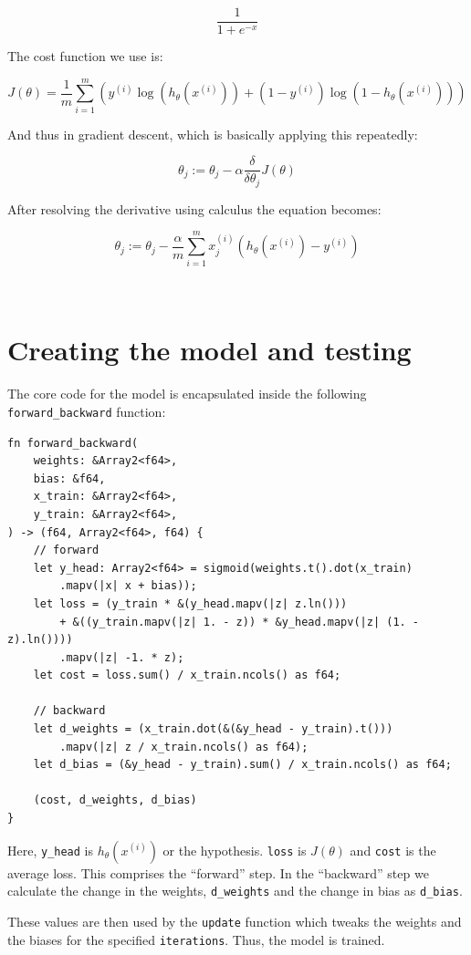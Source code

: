 \documentclass[12pt, a4]{article}
\begin{document}
\[ \frac{1}{1 + e^{-x}} \]

The cost function we use is:

\[ J(\theta) = \frac{1}{m} \sum_{i = 1}^{m}
  \left(
    y^{(i)}\log\left(h_{\theta}(x^{(i)})\right) +
    \left(1 - y^{(i)}\right)\log\left(1 - h_{\theta}(x^{(i)})\right)
  \right)
\]

And thus in gradient descent, which is basically applying this repeatedly:

\[
  \theta_{j} := \theta_{j} -
  \alpha \frac{\delta}{\delta\theta_{j}} J(\theta)
\]

After resolving the derivative using calculus the equation becomes:

\[
  \theta_{j} := \theta_{j} -
  \frac{\alpha}{m} \sum_{i = 1}^{m} x_{j}^{(i)}
  \left(h_{\theta}(x^{(i)}) - y^{(i)} \right)
\]

\

\section{Creating the model and testing}

The core code for the model is encapsulated inside the following
\texttt{forward\_backward} function:

\begin{verbatim}
fn forward_backward(
    weights: &Array2<f64>,
    bias: &f64,
    x_train: &Array2<f64>,
    y_train: &Array2<f64>,
) -> (f64, Array2<f64>, f64) {
    // forward
    let y_head: Array2<f64> = sigmoid(weights.t().dot(x_train)
        .mapv(|x| x + bias));
    let loss = (y_train * &(y_head.mapv(|z| z.ln()))
        + &((y_train.mapv(|z| 1. - z)) * &y_head.mapv(|z| (1. - z).ln())))
        .mapv(|z| -1. * z);
    let cost = loss.sum() / x_train.ncols() as f64;

    // backward
    let d_weights = (x_train.dot(&(&y_head - y_train).t()))
        .mapv(|z| z / x_train.ncols() as f64);
    let d_bias = (&y_head - y_train).sum() / x_train.ncols() as f64;

    (cost, d_weights, d_bias)
}
\end{verbatim}

Here, \texttt{y\_head} is $h_{\theta}(x^{(i)})$ or the hypothesis. \texttt{loss}
is $J(\theta)$ and \texttt{cost} is the average loss. This comprises the
``forward'' step. In the ``backward'' step we calculate the change in the weights,
\texttt{d\_weights} and the change in bias as \texttt{d\_bias}.

These values are then used by the \texttt{update} function which tweaks the
weights and the biases for the specified \texttt{iterations}. Thus, the model
is trained.
\end{document}
